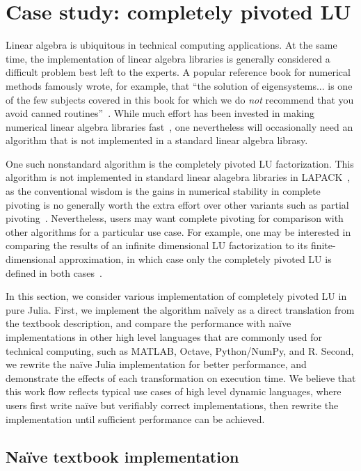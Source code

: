 \section{Case study: completely pivoted LU}

Linear algebra is ubiquitous in technical computing applications. At the same
time, the implementation of linear algebra libraries is generally considered a
difficult problem best left to the experts. A popular reference book for
numerical methods famously wrote, for example, that ``the solution of
eigensystems... is one of the few subjects covered in this book for which we do
\textit{not} recommend that you avoid canned routines''~\cite[Section 11.0, p.
461]{NumericalRecipesInC2e}. While much effort has been invested in making
numerical linear algebra libraries fast~\cite{LAPACK,FLAME,BLIS}, one
nevertheless will occasionally need an algorithm that is not implemented in a
standard linear algebra librasy.

One such nonstandard algorithm is the completely pivoted LU factorization. This
algorithm is not implemented in standard linear alagebra libraries in
LAPACK~\cite{LAPACK}, as the conventional wisdom is the gains in numerical
stability in complete pivoting is no generally worth the extra effort over
other variants such as partial pivoting~\cite{Golub2013}.  Nevertheless, users
may want complete pivoting for comparison with other algorithms for a
particular use case. For example, one may be interested in comparing the
results of an infinite dimensional LU factorization to its finite-dimensional
approximation, in which case only the completely pivoted LU is defined in both
cases~\cite{Townsend2015}.

In this section, we consider various implementation of completely pivoted LU in
pure Julia. First, we implement the algorithm na\"ively as a direct translation
from the textbook description, and compare the performance with na\"ive
implementations in other high level languages that are commonly used for
technical computing, such as MATLAB, Octave, Python/NumPy, and R. Second, we
rewrite the na\"ive Julia implementation for better performance, and
demonstrate the effects of each transformation on execution time. We believe
that this work flow reflects typical use cases of high level dynamic languages,
where users first write na\"ive but verifiably correct implementations, then
rewrite the implementation until sufficient performance can be achieved.



\subsection{Na\"ive textbook implementation}

